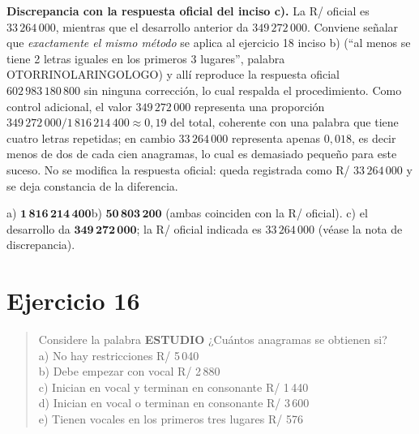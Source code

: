 \documentclass[11pt]{article}
\begin{document}
\begin{nota}
\textbf{Discrepancia con la respuesta oficial del inciso c).} La R/ oficial es $33\,264\,000$, mientras que
el desarrollo anterior da $349\,272\,000$. Conviene señalar que \emph{exactamente el mismo método} se
aplica al ejercicio 18 inciso b) (``al menos se tiene 2 letras iguales en los primeros 3 lugares'', palabra
OTORRINOLARINGOLOGO) y allí reproduce la respuesta oficial $602\,983\,180\,800$ sin ninguna corrección,
lo cual respalda el procedimiento. Como control adicional, el valor $349\,272\,000$ representa una
proporción $349\,272\,000/1\,816\,214\,400\approx 0{,}19$ del total, coherente con una palabra que tiene
cuatro letras repetidas; en cambio $33\,264\,000$ representa apenas $0{,}018$, es decir menos de dos de
cada cien anagramas, lo cual es demasiado pequeño para este suceso. No se modifica la respuesta oficial:
queda registrada como R/ $33\,264\,000$ y se deja constancia de la diferencia.
\end{nota}

\begin{resp}
a) $\mathbf{1\,816\,214\,400}$\quad b) $\mathbf{50\,803\,200}$ (ambas coinciden con la R/ oficial).\quad
c) el desarrollo da $\mathbf{349\,272\,000}$; la R/ oficial indicada es $33\,264\,000$ (véase la nota de
discrepancia).
\end{resp}

\section*{Ejercicio 16}

\begin{quote}
Considere la palabra \textbf{ESTUDIO} ¿Cuántos anagramas se obtienen si?\\
a) No hay restricciones \hfill R/ 5\,040\\
b) Debe empezar con vocal \hfill R/ 2\,880\\
c) Inician en vocal y terminan en consonante \hfill R/ 1\,440\\
d) Inician en vocal o terminan en consonante \hfill R/ 3\,600\\
e) Tienen vocales en los primeros tres lugares \hfill R/ 576
\end{quote}
\end{document}
